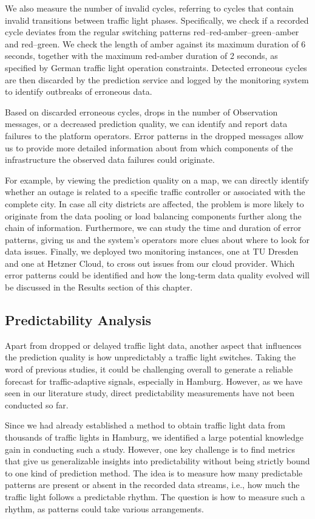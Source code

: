 We also measure the number of invalid cycles, referring to cycles that contain invalid transitions between traffic light phases. Specifically, we check if a recorded cycle deviates from the regular switching patterns red--red-amber--green--amber and red--green. We check the length of amber against its maximum duration of 6 seconds, together with the maximum red-amber duration of 2 seconds, as specified by German traffic light operation constraints. Detected erroneous cycles are then discarded by the prediction service and logged by the monitoring system to identify outbreaks of erroneous data.

Based on discarded erroneous cycles, drops in the number of Observation messages, or a decreased prediction quality, we can identify and report data failures to the platform operators. Error patterns in the dropped messages allow us to provide more detailed information about from which components of the infrastructure the observed data failures could originate. 

For example, by viewing the prediction quality on a map, we can directly identify whether an outage is related to a specific traffic controller or associated with the complete city. In case all city districts are affected, the problem is more likely to originate from the data pooling or load balancing components further along the chain of information. Furthermore, we can study the time and duration of error patterns, giving us and the system's operators more clues about where to look for data issues. Finally, we deployed two monitoring instances, one at TU Dresden and one at Hetzner Cloud, to cross out issues from our cloud provider. Which error patterns could be identified and how the long-term data quality evolved will be discussed in the Results section of this chapter.

\subsection{Predictability Analysis}

Apart from dropped or delayed traffic light data, another aspect that influences the prediction quality is how unpredictably a traffic light switches. Taking the word of previous studies, it could be challenging overall to generate a reliable forecast for traffic-adaptive signals, especially in Hamburg. However, as we have seen in our literature study, direct predictability measurements have not been conducted so far. 

Since we had already established a method to obtain traffic light data from thousands of traffic lights in Hamburg, we identified a large potential knowledge gain in conducting such a study. However, one key challenge is to find metrics that give us generalizable insights into predictability without being strictly bound to one kind of prediction method. The idea is to measure how many predictable patterns are present or absent in the recorded data streams, i.e., how much the traffic light follows a predictable rhythm. The question is how to measure such a rhythm, as patterns could take various arrangements.

